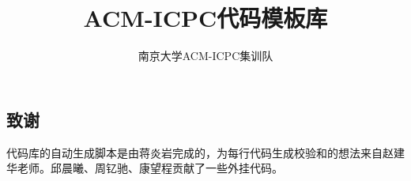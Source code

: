 \documentclass[9pt]{article}
\begin{document}
\title{\Huge \hei \bf ACM-ICPC代码模板库}
\author{南京大学ACM-ICPC集训队}
\date{}

\maketitle

\begin{multicols}{2}
\tableofcontents
\end{multicols}

\newpage

\columnseprule=0.25pt

\begin{multicols}{2}


\section*{致谢}

代码库的自动生成脚本是由蒋炎岩完成的，为每行代码生成校验和的想法来自赵建华老师。邱晨曦、周钇驰、康望程贡献了一些外挂代码。

\end{multicols}
\end{document}
